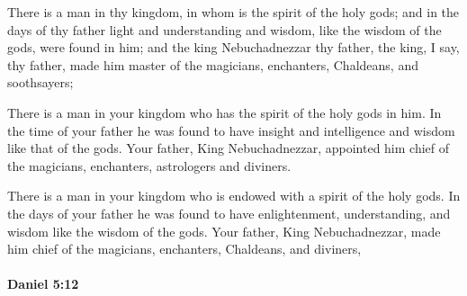 			\begin{versebox}
					\item[BHS] 
					\item[LXX] 
					\item[ASV] There is a man in thy kingdom, in whom is the spirit of the holy gods; and in the days of thy father light and understanding and wisdom, like the wisdom of the gods, were found in him; and the king Nebuchadnezzar thy father, the king, I say, thy father, made him master of the magicians, enchanters, Chaldeans, and soothsayers;
					\item[NIV] There is a man in your kingdom who has the spirit of the holy gods in him. In the time of your father he was found to have insight and intelligence and wisdom like that of the gods. Your father, King Nebuchadnezzar, appointed him chief of the magicians, enchanters, astrologers and diviners.
					\item[NRSV] There is a man in your kingdom who is endowed with a spirit of the holy gods. In the days of your father he was found to have enlightenment, understanding, and wisdom like the wisdom of the gods. Your father, King Nebuchadnezzar, made him chief of the magicians, enchanters, Chaldeans, and diviners,
			\end{versebox}

		\paragraph{Daniel 5:12} %
			\label{DANIEL-5-12}

